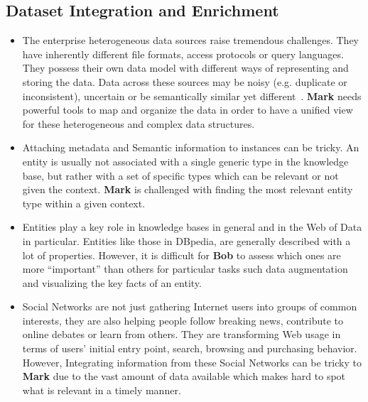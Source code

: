 \subsection{Dataset Integration and Enrichment}
\begin{itemize}
	\item The enterprise heterogeneous data sources raise tremendous challenges. They have inherently different file formats, access protocols or query languages. They possess their own data model with different ways of representing and storing the data. Data across these sources may be noisy (e.g. duplicate or inconsistent), uncertain or be semantically similar yet different~\cite{Avitha:EuroJorunal:11}. \textbf{Mark} needs powerful tools to map and organize the data in order to have a unified view for these heterogeneous and complex data structures.
	\item Attaching metadata and Semantic information to instances can be tricky. An entity is usually not associated with a single generic type in the knowledge base, but rather with a set of specific types which can be relevant or not given the context. \textbf{Mark} is challenged with finding the most relevant entity type within a given context.
	\item Entities play a key role in knowledge bases in general and in the Web of Data in particular. Entities like those in DBpedia, are generally described with a lot of properties. However, it is difficult for \textbf{Bob} to assess which ones are more ``important'' than others for particular tasks such data augmentation and visualizing the key facts of an entity.
	\item Social Networks are not just gathering Internet users into groups of common interests, they are also helping people follow breaking news, contribute to online debates or learn from others. They are transforming Web usage in terms of users' initial entry point, search, browsing and purchasing behavior. However, Integrating information from these Social Networks can be tricky to \textbf{Mark} due to the vast amount of data available which makes hard to spot what is relevant in a timely manner.
\end{itemize}

